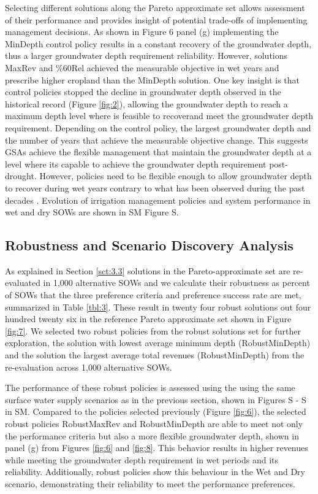 \documentclass[a4paper,fleqn]{cas-sc}
\begin{document}
Selecting different solutions along the Pareto approximate set allows assessment of their performance and provides insight of potential trade-offs of implementing management decisions. As shown in Figure 6 panel (g) implementing the MinDepth control policy results in a constant recovery of the groundwater depth, thus a larger groundwater depth requirement reliability. However, solutions MaxRev and \%60Rel achieved the measurable objective in wet years and prescribe higher cropland than the MinDepth solution. One key insight is that control policies stopped the decline in groundwater depth observed in the historical record (Figure \ref{fig:2}), allowing the groundwater depth to reach a maximum depth level where is feasible to recoverand meet the groundwater depth requirement. Depending on the control policy, the largest groundwater depth and the number of years that achieve the measurable objective change. This suggests GSAs achieve the flexible management that maintain the groundwater depth at a level where its capable to achieve the groundwater depth requirement post-drought. However, policies need to be flexible enough to allow groundwater depth to recover during wet years contrary to what has been observed during the past decades \citep{liu_groundwater_2022,alam_post-drought_2021}. Evolution of irrigation management policies and system performance in wet and dry SOWs are shown in SM Figure S.

\subsection{Robustness and Scenario Discovery Analysis}

As explained in Section \ref{sct:3.3} solutions in the Pareto-approximate set are re-evaluated in 1,000 alternative SOWs and we calculate their robustness as percent of SOWs that the three preference criteria and preference success rate are met, summarized in Table \ref{tbl:3}. These result in twenty four robust solutions out four hundred twenty six in the reference Pareto approximate set shown in Figure \ref{fig:7}. We selected two robust policies from the robust solutions set for further exploration, the solution with lowest average minimum depth (RobustMinDepth) and the solution the largest average total revenues (RobustMinDepth) from the re-evaluation across 1,000 alternative SOWs. 

The performance of these robust policies is assessed using the using the same surface water supply scenarios as in the previous section, shown in Figures S - S in SM. Compared to the policies selected previously (Figure \ref{fig:6}), the selected robust policies RobustMaxRev and RobustMinDepth are able to meet not only the performance criteria but also a more flexible groundwater depth, shown in panel (g) from Figures \ref{fig:6} and \ref{fig:8}. This behavior results in higher revenues while meeting the groundwater depth requirement in wet periods and its reliability. Additionally, robust policies show this behaviour in the Wet and Dry scenario, demonstrating their reliability to meet the performance preferences.
\end{document}
